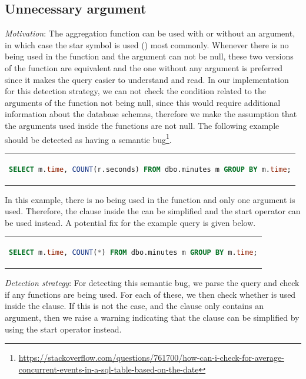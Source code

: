\subsection{Unnecessary  argument}
\emph{Motivation}: The  aggregation function can be used with or without an argument, in which case the star symbol is used (\sql{*}) most commonly. Whenever there is no  being used in the  function and the argument can not be null, these two versions of the  function are equivalent and the one without any argument is preferred since it makes the query easier to understand and read. In our implementation for this detection strategy, we can not check the condition related to the arguments of the  function not being null, since this would require additional information about the database schemas, therefore we make the assumption that the arguments used inside the  functions are not null. The following example should be detected as having a semantic bug\footnote{\url{https://stackoverflow.com/questions/761700/how-can-i-check-for-average-concurrent-events-in-a-sql-table-based-on-the-date}}.

\begin{center}
\begin{tabular}{c}
\begin{lstlisting}[language=SQL]
SELECT m.time, COUNT(r.seconds) FROM dbo.minutes m GROUP BY m.time;
\end{lstlisting}
\end{tabular}
\end{center}

In this example, there is no  being used in the  function and only one argument is used. Therefore, the clause inside the  can be simplified and the start operator can be used instead. A potential fix for the example query is given below.

\begin{center}
\begin{tabular}{c}
\begin{lstlisting}[language=SQL]
SELECT m.time, COUNT(*) FROM dbo.minutes m GROUP BY m.time;
\end{lstlisting}
\end{tabular}
\end{center}

\noindent \emph{Detection strategy}: For detecting this semantic bug, we parse the query and check if any  functions are being used. For each of these, we then check whether  is used inside the  clause. If this is not the case, and the clause only contains an argument, then we raise a warning indicating that the  clause can be simplified by using the start operator instead.

